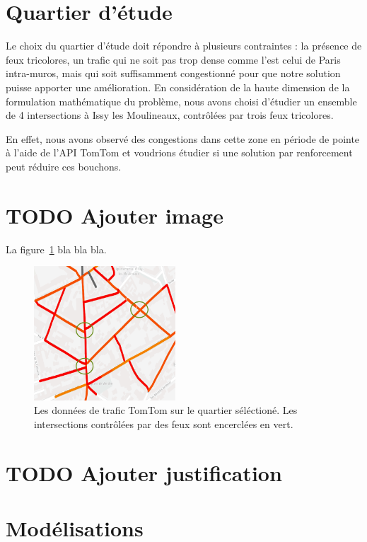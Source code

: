 \documentclass[11pt]{article}
\begin{document}
\section{Quartier d'étude}
\label{sec:orgf4a2322}

Le choix du quartier d'étude doit répondre à plusieurs contraintes : la présence de feux tricolores, un trafic qui ne soit pas trop dense comme l'est celui de Paris intra-muros, mais qui soit suffisamment congestionné pour que notre solution puisse apporter une amélioration.
En considération de la haute dimension de la formulation mathématique du problème, nous avons choisi d'étudier un ensemble de 4 intersections à Issy les Moulineaux, contrôlées par trois feux tricolores.

En effet, nous avons observé des congestions dans cette zone en période de pointe à l'aide de l'API TomTom et voudrions étudier si une solution par renforcement peut réduire ces bouchons.



\section{{\bfseries\sffamily TODO} Ajouter image}
\label{sec:orgd98edf9}

La figure \ref{fig:tomtom_data} bla bla bla.

\begin{figure}[htbp]
\centering
\includegraphics[width=200px]{./img/tomtom_data.png}
\caption{\label{fig:tomtom_data}
Les données de trafic TomTom sur le quartier séléctioné. Les intersections contrôlées par des feux sont encerclées en vert.}
\end{figure}


\section{{\bfseries\sffamily TODO} Ajouter justification}
\label{sec:orgfb99940}

\section{Modélisations}
\label{sec:org846459f}
\end{document}
